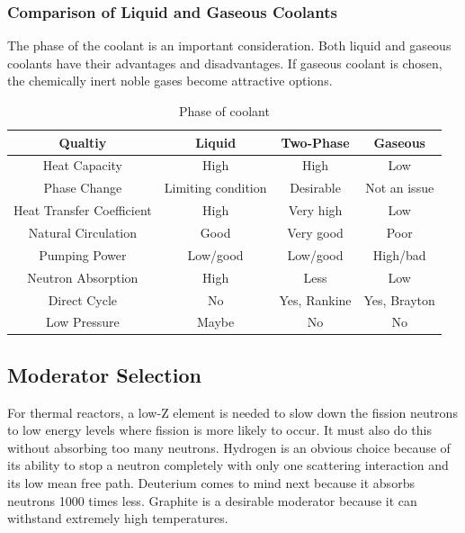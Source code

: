 
\subsubsection{Comparison of Liquid and Gaseous Coolants}
The phase of the coolant is an important consideration. Both liquid and gaseous coolants have their advantages and disadvantages.
If gaseous coolant is chosen, the chemically inert noble gases become attractive options.

\begin{table}[!ht]
\begin{tabular}{c|c|c|c}
  Qualtiy & Liquid & Two-Phase & Gaseous \\
  \hline
  Heat Capacity & High & High & Low \\
  Phase Change & Limiting condition & Desirable & Not an issue \\
  Heat Transfer Coefficient & High & Very high & Low \\
  Natural Circulation & Good & Very good & Poor \\
  Pumping Power & Low/good & Low/good & High/bad\\
  Neutron Absorption & High & Less & Low\\
  Direct Cycle & No & Yes, Rankine & Yes, Brayton\\
  Low Pressure & Maybe & No & No\\
  \hline
\end{tabular}
\caption{Phase of coolant}
\end{table}



\subsection{Moderator Selection}
For thermal reactors, a low-Z element is needed to slow down the fission neutrons to low energy levels where fission is more likely to occur. It must also do this without absorbing too many neutrons. Hydrogen is an obvious choice because of its ability to stop a neutron completely with only one scattering interaction and its low mean free path. Deuterium comes to mind next because it absorbs neutrons 1000 times less. Graphite is a desirable moderator because it can withstand extremely high temperatures.

